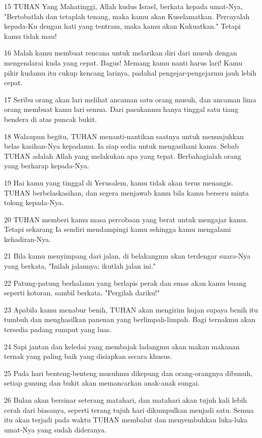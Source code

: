\par 15 TUHAN Yang Mahatinggi, Allah kudus Israel, berkata kepada umat-Nya, "Bertobatlah dan tetaplah tenang, maka kamu akan Kuselamatkan. Percayalah kepada-Ku dengan hati yang tentram, maka kamu akan Kukuatkan." Tetapi kamu tidak mau!
\par 16 Malah kamu membuat rencana untuk melarikan diri dari musuh dengan mengendarai kuda yang cepat. Bagus! Memang kamu nanti harus lari! Kamu pikir kudamu itu cukup kencang larinya, padahal pengejar-pengejarmu jauh lebih cepat.
\par 17 Seribu orang akan lari melihat ancaman satu orang musuh, dan ancaman lima orang membuat kamu lari semua. Dari pasukanmu hanya tinggal satu tiang bendera di atas puncak bukit.
\par 18 Walaupun begitu, TUHAN menanti-nantikan saatnya untuk menunjukkan belas kasihan-Nya kepadamu. Ia siap sedia untuk mengasihani kamu. Sebab TUHAN adalah Allah yang melakukan apa yang tepat. Berbahagialah orang yang berharap kepada-Nya.
\par 19 Hai kamu yang tinggal di Yerusalem, kamu tidak akan terus menangis. TUHAN berbelaskasihan, dan segera menjawab kamu bila kamu berseru minta tolong kepada-Nya.
\par 20 TUHAN memberi kamu masa percobaan yang berat untuk mengajar kamu. Tetapi sekarang Ia sendiri mendampingi kamu sehingga kamu mengalami kehadiran-Nya.
\par 21 Bila kamu menyimpang dari jalan, di belakangmu akan terdengar suara-Nya yang berkata, "Inilah jalannya; ikutlah jalan ini."
\par 22 Patung-patung berhalamu yang berlapis perak dan emas akan kamu buang seperti kotoran, sambil berkata, "Pergilah dariku!"
\par 23 Apabila kamu menabur benih, TUHAN akan mengirim hujan supaya benih itu tumbuh dan menghasilkan panenan yang berlimpah-limpah. Bagi ternakmu akan tersedia padang rumput yang luas.
\par 24 Sapi jantan dan keledai yang membajak ladangmu akan makan makanan ternak yang paling baik yang disiapkan secara khusus.
\par 25 Pada hari benteng-benteng musuhmu dikepung dan orang-orangnya dibunuh, setiap gunung dan bukit akan memancarkan anak-anak sungai.
\par 26 Bulan akan bersinar seterang matahari, dan matahari akan tujuh kali lebih cerah dari biasanya, seperti terang tujuh hari dikumpulkan menjadi satu. Semua itu akan terjadi pada waktu TUHAN membalut dan menyembuhkan luka-luka umat-Nya yang sudah dideranya.
